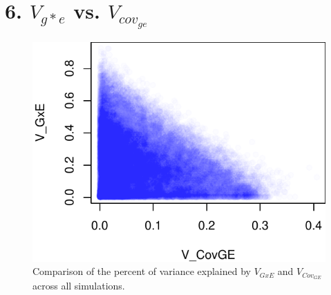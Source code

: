 \documentclass[11pt, oneside]{amsart}
\begin{document}
\clearpage
\newpage

\renewcommand{\figurename}{Supplementary Figure}
\section{6. $V_{g*e}$ vs. $V_{cov_{ge}}$}
\renewcommand\thefigure{S6}
\begin{figure}[h]
\begin{center}
\includegraphics[width=6in]{Figs/VgxevsVcov.pdf}
\end{center}
\label{Fig: }
\caption[Comparison of the percent of variance explained by $V_{GxE}$ and $V_{Cov_{GE}}$ across all simulations.]{Comparison of the percent of variance explained by $V_{GxE}$ and $V_{Cov_{GE}}$ across all simulations.  }
\end{figure}

\clearpage
\newpage

\renewcommand{\figurename}{Supplementary Figure}
\end{document}
